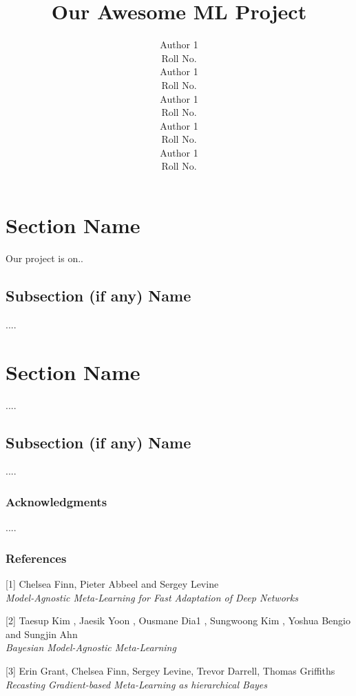 \documentclass{article} %
\title{Our Awesome ML Project}
\author{
Author 1 \\
Roll No. \\
\And
Author 1 \\
Roll No. \\
\AND
Author 1 \\
Roll No. \\
\And
Author 1 \\
Roll No. \\
\And
Author 1 \\
Roll No. \\
}
\begin{document}



\section{Section Name}

Our project is on..

\subsection{Subsection (if any) Name}

....

\section{Section Name}

....

\subsection{Subsection (if any) Name}

....


\subsubsection*{Acknowledgments}

....

\subsubsection*{References}

\small{
[1] Chelsea Finn, Pieter Abbeel and Sergey Levine\\
\textit{Model-Agnostic Meta-Learning for Fast Adaptation of Deep Networks}

[2] Taesup Kim
, Jaesik Yoon
, Ousmane Dia1
, Sungwoong Kim
,
Yoshua Bengio
and Sungjin Ahn\\
\textit{Bayesian Model-Agnostic Meta-Learning}

[3] Erin Grant, Chelsea Finn, Sergey Levine, Trevor Darrell, Thomas Griffiths\\
\textit{Recasting Gradient-based Meta-Learning as
hierarchical Bayes}
}
\end{document}
